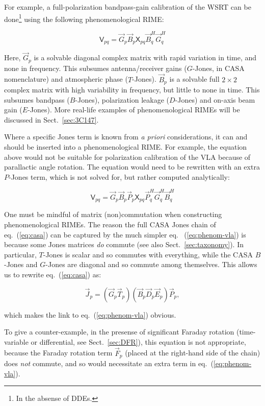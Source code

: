 \documentclass[]{aa}
\newcommand{\herm}{H}
\newcommand{\jones}[2]{\vec {#1}_{#2}}
\newcommand{\jonesT}[2]{\vec {#1}^{\herm}_{#2}}
\newcommand{\coh}[2]{\mathsf{{#1}}_{{#2}}}
\begin{document}
For example, a full-polarization bandpass-gain calibration of the WSRT can be done\footnote{In the absense of DDEs.} using the following phenomenological RIME:

\[
\coh{V}{pq} = \jones{G}{p} \jones{B}{p} \coh{X}{pq} \jonesT{B}{q} \jonesT{G}{q} 
\]

Here, $\jones{G}{p}$ is a solvable diagonal complex matrix with rapid variation in time, and none in frequency. This subsumes antenna/receiver gains ($G$-Jones, in CASA nomenclature) and atmospheric phase ($T$-Jones). $\jones{B}{p}$ is a solvable full $2\times2$ complex matrix with high variability in frequency, but little to none in time. This subsumes bandpass ($B$-Jones), polarization leakage ($D$-Jones) and on-axis beam gain ($E$-Jones). More real-life examples of phenomenological RIMEs will be discussed in Sect.~\ref{sec:3C147}.

Where a specific Jones term is known from \emph{a priori} considerations, it can and should be inserted into a phenomenological RIME. For example, the equation above would not be suitable for polarization calibration of the VLA because of parallactic angle rotation. The equation would need to be rewritten with an extra $P$-Jones term, which is not solved for, but rather computed analytically:

\begin{equation}\label{eq:phenom-vla}
\coh{V}{pq} = \jones{G}{p} \jones{B}{p} \jones{P}{p} \coh{X}{pq} \jonesT{P}{q} \jonesT{G}{q} \jonesT{B}{q} 
\end{equation}

One must be mindful of matrix (non)commutation when constructing phenomenological RIMEs. The reason the full CASA Jones chain of eq.~(\ref{eq:casa}) can be captured by the much simpler eq. ~(\ref{eq:phenom-vla}) is because some Jones matrices \emph{do} commute (see also Sect.~\ref{sec:taxonomy}). In particular, $T$-Jones is scalar and so commutes with everything, while the CASA $B$-Jones and $G$-Jones are diagonal and so commute among themselves. This allows us to rewrite eq.~(\ref{eq:casa}) as:

\[
\jones{J}{p} = (\jones{G}{p}\jones{T}{p})(\jones{B}{p}\jones{D}{p}\jones{E}{p})\jones{P}{p},
\]

which makes the link to eq.~(\ref{eq:phenom-vla}) obvious. 

To give a counter-example, in the presense of significant Faraday rotation (time-variable or differential, see Sect.~\ref{sec:DFR}), this equation is not appropriate, because the Faraday rotation term $\jones{F}{p}$ (placed at the right-hand side of the chain) does \emph{not} commute, and so would necessitate an extra term in eq.~(\ref{eq:phenom-vla}). 
\end{document}
